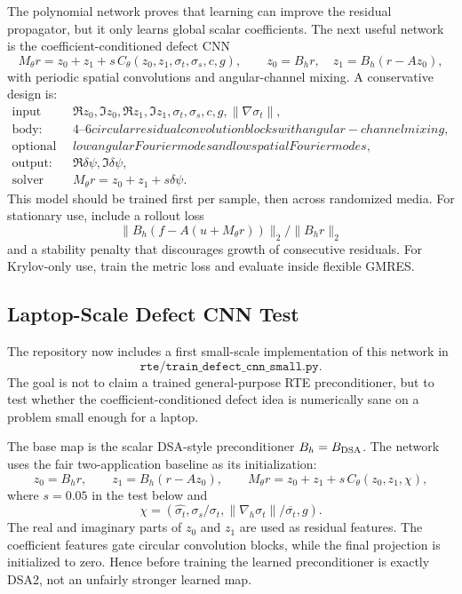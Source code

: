 \documentclass[11pt]{article}
\begin{document}
The polynomial network proves that learning can improve the residual
propagator, but it only learns global scalar coefficients.  The next useful
network is the coefficient-conditioned defect CNN
\[
  M_\theta r
  =
  z_0+z_1
  +
  s\,C_\theta\!\left(z_0,z_1,\sigma_t,\sigma_s,c,g\right),
  \qquad
  z_0=B_hr,\quad z_1=B_h(r-Az_0),
\]
with periodic spatial convolutions and angular-channel mixing.  A conservative
design is:
\[
\begin{array}{ll}
\text{input channels:} &
  \Re z_0,\Im z_0,\Re z_1,\Im z_1,
  \sigma_t,\sigma_s,c,g,\|\nabla\sigma_t\|,\\
\text{body:} &
  4\text{--}6 circular residual convolution blocks with angular-channel mixing,\\
\text{optional global branch:} &
  low angular Fourier modes and low spatial Fourier modes,\\
\text{output:} &
  \Re \delta\psi,\Im \delta\psi,\\
\text{solver map:} &
  M_\theta r=z_0+z_1+s\delta\psi .
\end{array}
\]
This model should be trained first per sample, then across randomized media.
For stationary use, include a rollout loss
\[
  \|B_h(f-A(u+M_\theta r))\|_2/\|B_h r\|_2
\]
and a stability penalty that discourages growth of consecutive residuals.  For
Krylov-only use, train the metric loss and evaluate inside flexible GMRES.

\subsection{Laptop-Scale Defect CNN Test}

The repository now includes a first small-scale implementation of this network
in
\[
  \texttt{rte/train\_defect\_cnn\_small.py}.
\]
The goal is not to claim a trained general-purpose RTE preconditioner, but to
test whether the coefficient-conditioned defect idea is numerically sane on a
problem small enough for a laptop.

The base map is the scalar DSA-style preconditioner \(B_h=B_{\rm DSA}\).  The
network uses the fair two-application baseline as its initialization:
\[
  z_0=B_hr,\qquad z_1=B_h(r-Az_0),\qquad
  M_\theta r=z_0+z_1+s\,C_\theta(z_0,z_1,\chi),
\]
where \(s=0.05\) in the test below and
\[
  \chi=(\widehat{\sigma_t},\sigma_s/\sigma_t,
  \|\nabla_h\sigma_t\|/\overline{\sigma_t},g).
\]
The real and imaginary parts of \(z_0\) and \(z_1\) are used as residual
features.  The coefficient features gate circular convolution blocks, while the
final projection is initialized to zero.  Hence before training the learned
preconditioner is exactly DSA2, not an unfairly stronger learned map.
\end{document}
